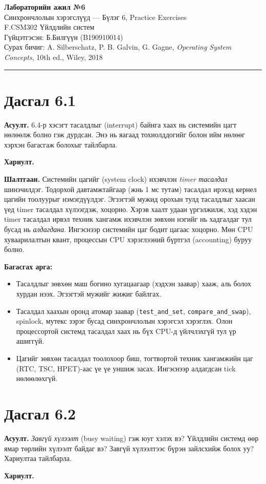 \documentclass[12pt,a4paper]{article}
\newcommand{\question}[2]{\section{Дасгал #1}\textbf{Асуулт.} #2\par\medskip\textbf{Хариулт.}\par}
\begin{document}
\begin{center}
  {\Large\bfseries Лабораторийн ажил №6}\\[0.4em]
  {\large Синхрончлолын хэрэгслүүд — Бүлэг 6, Practice Exercises}\\[0.8em]
  F.CSM302 Үйлдлийн систем\\
  Гүйцэтгэсэн: Б.Билгүүн (B190910014)\\[0.3em]
  Сурах бичиг: A. Silberschatz, P. B. Galvin, G. Gagne, \textit{Operating System Concepts}, 10th ed., Wiley, 2018
\end{center}
\hrule
\bigskip

\question{6.1}{6.4-р хэсэгт тасалдлыг (interrupt) байнга хаах нь системийн цагт нөлөөлж болно гэж дурдсан. Энэ нь яагаад тохиолддогийг болон ийм нөлөөг хэрхэн багасгаж болохыг тайлбарла.}

\textbf{Шалтгаан.} Системийн цагийг (system clock) ихэвчлэн \emph{timer тасалдал} шинэчилдэг. Тодорхой давтамжтайгаар (жнь 1 мс тутам) тасалдал ирэхэд кернел цагийн тоолуурыг нэмэгдүүлдэг. Эгзэгтэй мужид орохын тулд тасалдлыг хаасан үед timer тасалдал хүлээгдэж, хоцорно. Хэрэв хаалт удаан үргэлжилж, хэд хэдэн timer тасалдал ирвэл техник хангамж ихэвчлэн зөвхөн нэгийг нь хадгалдаг тул бусад нь \emph{алдагдана}. Ингэснээр системийн цаг бодит цагаас хоцорно. Мөн CPU хуваарилалтын квант, процессын CPU хэрэглээний бүртгэл (accounting) буруу болно.

\textbf{Багасгах арга:}
\begin{itemize}[leftmargin=1.5em]
  \item Тасалдлыг зөвхөн маш богино хугацаагаар (хэдхэн заавар) хааж, аль болох хурдан нээх. Эгзэгтэй мужийг жижиг байлгах.
  \item Тасалдал хаахын оронд атомар заавар (\texttt{test\_and\_set}, \texttt{compare\_and\_swap}), spinlock, мутекс зэрэг бусад синхрончлолын хэрэгсэл хэрэглэх. Олон процессортой системд тасалдал хаах нь бүх CPU-д үйлчлэхгүй тул үр ашиггүй.
  \item Цагийг зөвхөн тасалдал тоолохоор биш, тогтвортой техник хангамжийн цаг (RTC, TSC, HPET)-аас үе үе уншиж засах. Ингэснээр алдагдсан tick нөлөөлөхгүй.
\end{itemize}

\question{6.2}{\emph{Завгүй хүлээлт} (busy waiting) гэж юуг хэлэх вэ? Үйлдлийн системд өөр ямар төрлийн хүлээлт байдаг вэ? Завгүй хүлээлтээс бүрэн зайлсхийж болох уу? Хариултаа тайлбарла.}
\end{document}
